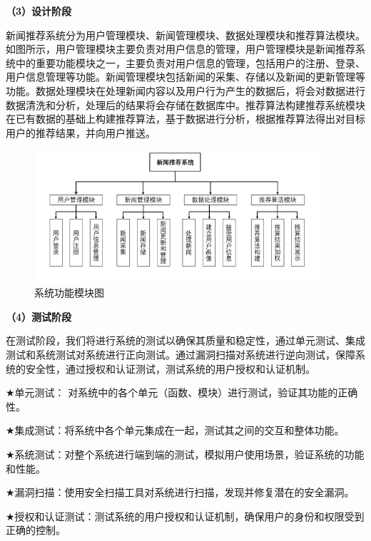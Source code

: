 \documentclass[withoutpreface,bwprint]{cumcmthesis} %
\begin{document}
	\textbf{（3）设计阶段}\par
	新闻推荐系统分为用户管理模块、新闻管理模块、数据处理模块和推荐算法模块。如图所示，用户管理模块主要负责对用户信息的管理，用户管理模块是新闻推荐系统中的重要功能模块之一，主要负责对用户信息的管理，包括用户的注册、登录、用户信息管理等功能。新闻管理模块包括新闻的采集、存储以及新闻的更新管理等功能。数据处理模块在处理新闻内容以及用户行为产生的数据后，将会对数据进行数据清洗和分析，处理后的结果将会存储在数据库中。推荐算法构建推荐系统模块在已有数据的基础上构建推荐算法，基于数据进行分析，根据推荐算法得出对目标用户的推荐结果，并向用户推送。\par
	\begin{figure}[H]
		\centering
		\includegraphics[width=0.95\textwidth]{系统功能模块图}
		\caption{系统功能模块图}
		\label{fig:circuit-diagcam}
	\end{figure}
	\textbf{（4）测试阶段}\par
	在测试阶段，我们将进行系统的测试以确保其质量和稳定性，通过单元测试、集成测试和系统测试对系统进行正向测试。通过漏洞扫描对系统进行逆向测试，保障系统的安全性，通过授权和认证测试，测试系统的用户授权和认证机制。\par
	$\bigstar$单元测试： 对系统中的各个单元（函数、模块）进行测试，验证其功能的正确性。\par
	$\bigstar$集成测试：将系统中各个单元集成在一起，测试其之间的交互和整体功能。\par
	$\bigstar$系统测试：对整个系统进行端到端的测试，模拟用户使用场景，验证系统的功能和性能。\par
	$\bigstar$漏洞扫描：使用安全扫描工具对系统进行扫描，发现并修复潜在的安全漏洞。\par
	$\bigstar$授权和认证测试：测试系统的用户授权和认证机制，确保用户的身份和权限受到正确的控制。
\end{document}
